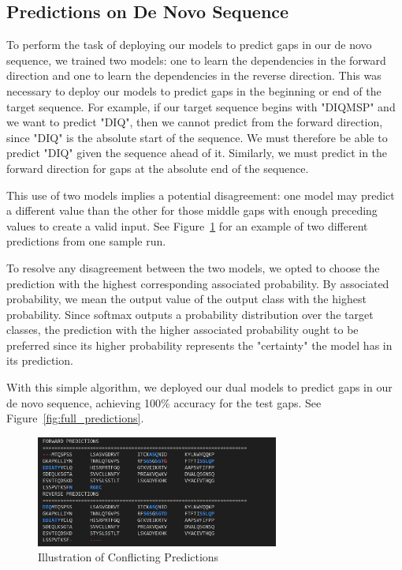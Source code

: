 \documentclass[journal]{IEEEtran}
\begin{document}
  \subsection{Predictions on De Novo Sequence}
    To perform the task of deploying our models to predict gaps in our de novo sequence, 
    we trained two models: one to learn the dependencies in the forward direction and
    one to learn the dependencies in the reverse direction. This was necessary to deploy 
    our models to predict gaps in the beginning or end of the target sequence. 
    For example, if our target sequence begins with "DIQMSP" and we want to predict "DIQ", then
    we cannot predict from the forward direction, since "DIQ" is the absolute start of 
    the sequence. We must therefore be able to predict "DIQ" given the sequence
    ahead of it. Similarly, we must predict in the forward direction for gaps at the absolute end of the sequence.

    This use of two models implies a potential disagreement: one model may predict
    a different value than the other for those middle gaps with enough
    preceding values to create a valid input. See Figure~\ref{fig:forward_reverse_predictions}
    for an example of two different predictions from one sample run.
    
    To resolve any disagreement between the two models, 
    we opted to choose the prediction with the highest corresponding associated
    probability. By associated probability, we mean the output value
    of the output class with the highest probability.
    Since softmax outputs a probability distribution over the target classes,
    the prediction with the higher associated probability ought to be 
    preferred since its higher probability represents the "certainty"
    the model has in its prediction. 

    With this simple algorithm, we deployed our dual models to predict
    gaps in our de novo sequence, achieving 100\% accuracy for the test gaps.
    See Figure~\ref{fig:full_predictions}.

    \begin{figure}[h]
      \centering
      \includegraphics[width=8cm]{figures/forward_reverse_predictions.png}
      \caption{Illustration of Conflicting Predictions}
      \label{fig:forward_reverse_predictions}
    \end{figure}
\end{document}
